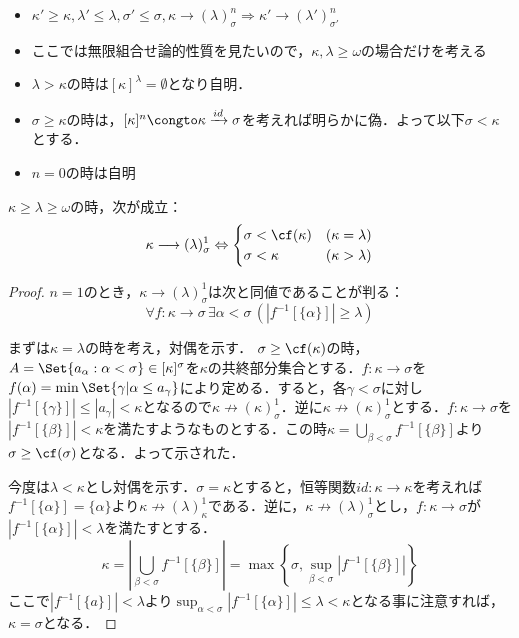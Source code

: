 \documentclass[a4j,lualatex,ja=standard]{bxjsarticle}
\begin{document}
\begin{rem*}
 \begin{itemize}
  \item $\kappa' \geq \kappa, \lambda' \leq \lambda, \sigma' \leq \sigma, \kappa \longrightarrow (\lambda)^n_\sigma
	\Longrightarrow \kappa' \longrightarrow (\lambda')^n_{\sigma'}$
  \item ここでは無限組合せ論的性質を見たいので，$\kappa, \lambda \geq \omega$の場合だけを考える
  \item $\lambda > \kappa$の時は$[\kappa]^\lambda = \emptyset$となり自明．
  \item $\sigma \geq \kappa$の時は，$[\kappa]^n \congto \kappa \xrightarrow[]{id} \sigma$を考えれば明らかに偽．よって以下$\sigma < \kappa$とする．
  \item $n = 0$の時は自明
 \end{itemize}
\end{rem*}

\begin{lemma}\label{er:small}
 $\kappa \geq \lambda \geq \omega$の時，次が成立：
 \[
  \kappa \longrightarrow (\lambda)^1_\sigma
 \Leftrightarrow \begin{cases}
		  \sigma < \cf(\kappa) & (\kappa = \lambda)\\
		  \sigma < \kappa      & (\kappa > \lambda)
		 \end{cases}
 \]
\end{lemma}
\begin{proof}
 $n = 1$のとき，$\kappa \longrightarrow (\lambda)^1_\sigma$は次と同値であることが判る：
 \[
  \forall f : \kappa \rightarrow \sigma \, \exists \alpha < \sigma \, (|f^{-1}[\{\alpha\}]| \geq \lambda)
 \]
 
 まずは$\kappa = \lambda$の時を考え，対偶を示す．
 $\sigma \geq \cf(\kappa)$の時，$A = \Set{a_\alpha : \alpha < \sigma} \in [\kappa]^\sigma$を$\kappa$の共終部分集合とする．$f : \kappa \rightarrow \sigma$を$f(\alpha) = \min \Set{\gamma | \alpha \leq a_\gamma}$により定める．すると，各$\gamma < \sigma$に対し$|f^{-1}[\{\gamma\}]| \leq |a_\gamma| < \kappa$となるので$\kappa \nrightarrow (\kappa)^1_\sigma$．逆に$\kappa \nrightarrow (\kappa)^1_\sigma$とする．$f: \kappa \rightarrow \sigma$を$|f^{-1}[\{\beta\}]| < \kappa$を満たすようなものとする．この時$\kappa = \bigcup_{\beta < \sigma} f^{-1}[\{\beta\}]$より$\sigma \geq \cf(\sigma)$となる．よって示された．

 今度は$\lambda < \kappa$とし対偶を示す．$\sigma = \kappa$とすると，恒等関数$id: \kappa \rightarrow \kappa$を考えれば$f^{-1}[\{\alpha\}] = \{\alpha\}$より$\kappa \nrightarrow (\lambda)^1_\kappa$である．逆に，$\kappa \nrightarrow (\lambda)^1_\sigma$とし，$f : \kappa \rightarrow \sigma$が$|f^{-1}[\{\alpha\}]| < \lambda$を満たすとする．
 \[
  \kappa = \left|\bigcup_{\beta < \sigma} f^{-1}[\{\beta\}]\right| = \max\left\{ \sigma, \sup_{\beta < \sigma} \left|f^{-1}[\{\beta\}]\right| \right\}
 \]
 ここで$|f^{-1}[\{a\}]| < \lambda$より$\sup_{\alpha < \sigma} |f^{-1}[\{\alpha\}]| \leq \lambda < \kappa$となる事に注意すれば，$\kappa = \sigma$となる．\mbox{}
\end{proof}
\end{document}
